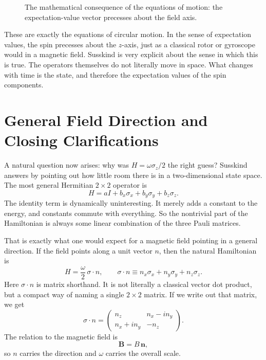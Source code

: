 \begin{figure}[ht]
\centering
{}
\caption{The mathematical consequence of the equations of motion: the expectation-value vector precesses about the field axis.}
\end{figure}

These are exactly the equations of circular motion. In the sense of expectation values, the spin precesses about the \(z\)-axis, just as a classical rotor or gyroscope would in a magnetic field. Susskind is very explicit about the sense in which this is true. The operators themselves do not literally move in space. What changes with time is the state, and therefore the expectation values of the spin components.

\section{General Field Direction and Closing Clarifications}

A natural question now arises: why was \(H=\omega\sigma_z/2\) the right guess? Susskind answers by pointing out how little room there is in a two-dimensional state space. The most general Hermitian \(2\times2\) operator is
\begin{equation}
H=aI+b_x\sigma_x+b_y\sigma_y+b_z\sigma_z.
\end{equation}
The identity term is dynamically uninteresting. It merely adds a constant to the energy, and constants commute with everything. So the nontrivial part of the Hamiltonian is always some linear combination of the three Pauli matrices.

That is exactly what one would expect for a magnetic field pointing in a general direction. If the field points along a unit vector \(n\), then the natural Hamiltonian is
\begin{equation}
H=\frac{\omega}{2}\,\sigma\cdot n,
\qquad
\sigma\cdot n \equiv n_x\sigma_x+n_y\sigma_y+n_z\sigma_z.
\end{equation}
Here \(\sigma\cdot n\) is matrix shorthand. It is not literally a classical vector dot product, but a compact way of naming a single \(2\times2\) matrix. If we write out that matrix, we get
\begin{equation}
\sigma\cdot n=
\begin{pmatrix}
n_z & n_x-i n_y \\
n_x+i n_y & -n_z
\end{pmatrix}.
\end{equation}
The relation to the magnetic field is
\begin{equation}
\mathbf{B}=B\,\mathbf{n},
\end{equation}
so \(n\) carries the direction and \(\omega\) carries the overall scale.


